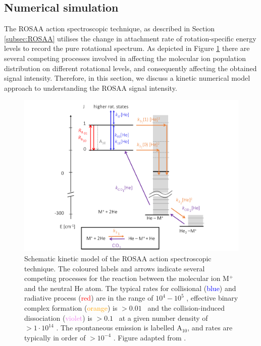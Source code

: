 \subsection{Numerical simulation}
\label{subsec:ROSAA-simulation}

The ROSAA action spectroscopic technique, as described in Section \ref{subsec:ROSAA} utilises the change in attachment rate of rotation-specific energy levels to record the pure rotational spectrum. As depicted in Figure \ref{fig:setup:ROSAA} there are several competing processes involved in affecting the molecular ion population distribution on different rotational levels, and consequently affecting the obtained signal intensity. Therefore, in this section, we discuss a kinetic numerical model approach to understanding the ROSAA signal intensity.

\begin{figure}[!htb]
    \centering
    
    \includegraphics[width=1\textwidth]{figures/methods/ROSAA.pdf}
    \caption{Schematic kinetic model of the ROSAA action spectroscopic technique. The coloured labels and arrows indicate several competing processes for the reaction between the molecular ion M$^+$ and the neutral He atom. The typical rates for collisional (\textcolor{blue}{blue}) and radiative process (\textcolor{red}{red}) are in the range of $10^{4} - 10^{5}$ \pers, effective binary complex formation (\textcolor{orange}{orange}) is $> 0.01$ \pers\ and the collision-induced dissociation (\textcolor{violet}{violet}) is $> 0.1$ \pers\ at a given number density of $> 1 \cdot 10^{14}$ \percc. The spontaneous emission is labelled A$_{10}$, and rates are typically in order of $> 10^{-4}$ \pers. Figure adapted from \citet{Brunken2017}.}
    \label{fig:setup:ROSAA}
\end{figure}

